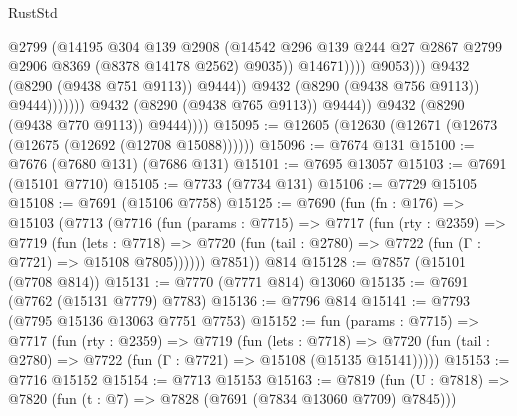 \begin{lexlean}{RustStd}
\begin{coremodule}
                                                @2799
                                                (@14195
                                                  @304
                                                  @139
                                                  @2908
                                                  (@14542
                                                    @296
                                                    @139
                                                    @244
                                                    @27
                                                    @2867
                                                    @2799
                                                    @2906
                                                    @8369
                                                    (@8378 @14178 @2562)
                                                    @9035))
                                                @14671))))
                                        @9053)))
                                  @9432
                                  (@8290 (@9438 @751 @9113))
                                  @9444))
                              @9432
                              (@8290 (@9438 @756 @9113))
                              @9444)))))))
                @9432
                (@8290 (@9438 @765 @9113))
                @9444))
            @9432
            (@8290 (@9438 @770 @9113))
            @9444))))
@15095 := @12605 (@12630 (@12671 (@12673 (@12675 (@12692 (@12708 @15088))))))
@15096 := @7674 @131
@15100 := @7676 (@7680 @131) (@7686 @131)
@15101 := @7695 @13057
@15103 := @7691 (@15101 @7710)
@15105 := @7733 (@7734 @131)
@15106 := @7729 @15105
@15108 := @7691 (@15106 @7758)
@15125 := @7690
    (fun (fn : @176) =>
    @15103
      (@7713
        (@7716
          (fun (params : @7715) =>
          @7717
            (fun (rty : @2359) =>
            @7719
              (fun (lets : @7718) =>
              @7720 (fun (tail : @2780) => @7722 (fun (Γ : @7721) => @15108 @7805))))))
        @7851))
    @814
@15128 := @7857 (@15101 (@7708 @814))
@15131 := @7770 (@7771 @814) @13060
@15135 := @7691 (@7762 (@15131 @7779) @7783)
@15136 := @7796 @814
@15141 := @7793 (@7795 @15136 @13063 @7751 @7753)
@15152 := fun (params : @7715) =>
  @7717
    (fun (rty : @2359) =>
    @7719
      (fun (lets : @7718) =>
      @7720 (fun (tail : @2780) => @7722 (fun (Γ : @7721) => @15108 (@15135 @15141)))))
@15153 := @7716 @15152
@15154 := @7713 @15153
@15163 := @7819
    (fun (U : @7818) => @7820 (fun (t : @7) => @7828 (@7691 (@7834 @13060 @7709) @7845)))

\end{coremodule}
\end{lexlean}
